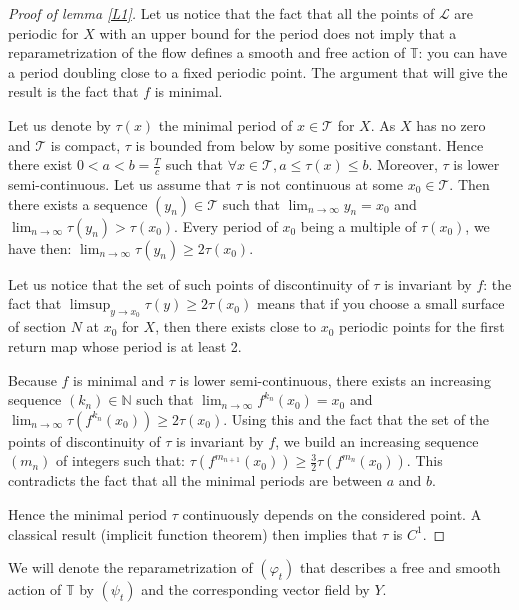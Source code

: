 \documentclass{dcds}
\theoremstyle{definition}
\begin{document}
\begin{proof}[Proof of lemma \ref{L1}]
Let us notice that the fact that all the points of ${\mathcal {L}}$ are periodic for $X$ with an upper  bound for the period does not imply that a reparametrization of the flow defines a smooth and free action of ${\mathbb {T}}$: you can have a period doubling close to a fixed periodic point. The argument that will give the result is the fact that $f$ is minimal.

 Let us denote by $\tau(x)$ the minimal period of $x\in{\mathcal {T}}$  for $X$. As $X$ has no zero  and ${\mathcal {T}}$ is compact, $\tau$ is bounded from below by some positive constant. Hence there exist $0<a<b=\frac{T}{c}$ such that $\forall x\in{\mathcal {T}}, a\leq \tau (x)\leq b$. Moreover, $\tau$ is lower semi-continuous. Let us assume that $\tau$ is not continuous at some $x_0\in{\mathcal {T}}$.  Then there exists a sequence $(y_n)\in{\mathcal {T}}$ such that $\displaystyle{\lim_{n\rightarrow \infty} y_n=x_0}$ and $\displaystyle{\lim_{n\rightarrow \infty}\tau(y_n)>\tau (x_0)}$. Every period of $x_0$ being a multiple of $\tau(x_0)$, we have then: $\displaystyle{\lim_{n\rightarrow \infty}\tau(y_n)\geq 2\tau (x_0)}$.

 Let us notice that the set of such points of discontinuity of $\tau$ is invariant by $f$: the fact that $\displaystyle{\limsup_{y\rightarrow x_0}\tau(y)\geq 2\tau(x_0)}$ means that if you choose a small surface of section $N$ at $x_0$ for $X$, then there exists close to $x_0$ periodic points for the first return map whose period is at least 2.

  Because $f$ is minimal and $\tau$ is lower semi-continuous, there exists an increasing sequence $(k_n)\in{\mathbb {N}}$ such that $\displaystyle{\lim_{n\rightarrow \infty}f^{k_n}(x_0)=x_0}$ and $\displaystyle{\lim_{n\rightarrow \infty} \tau(f^{k_n}(x_0))\geq 2\tau (x_0)}$. Using this and the fact that the set of the points of discontinuity of $\tau$ is invariant by $f$, we build an increasing  sequence $(m_n)$ of integers such that: $\tau (f^{m_{n+1}}(x_0))\geq \frac{3}{2}\tau(f^{m_n}(x_0))$. This contradicts the fact that all the minimal periods are between $a$ and $b$.

Hence the minimal period $\tau$ continuously depends on the considered point. A classical result (implicit function theorem) then implies that $\tau$ is $C^1$.
\end{proof}
We will denote the reparametrization of $(\varphi_t)$ that describes a free and smooth action of ${\mathbb {T}}$ by $(\psi_t)$ and the corresponding vector field by $Y$.
\end{document}
